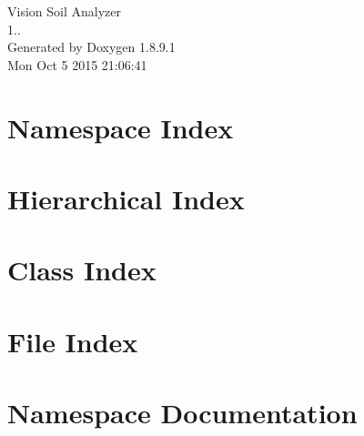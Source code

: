 \hypersetup{pageanchor=false,
             bookmarks=true,
             bookmarksnumbered=true,
             pdfencoding=unicode
            }
\begin{titlepage}
\vspace*{7cm}
\begin{center}%
{\Large Vision Soil Analyzer \\[1ex]\large 1.. }\\
\vspace*{1cm}
{\large Generated by Doxygen 1.8.9.1}\\
\vspace*{0.5cm}
{\small Mon Oct 5 2015 21:06:41}\\
\end{center}
\end{titlepage}
\tableofcontents
{}
\hypersetup{pageanchor=true}

\section{Namespace Index}

\section{Hierarchical Index}

\section{Class Index}

\section{File Index}

\section{Namespace Documentation}











